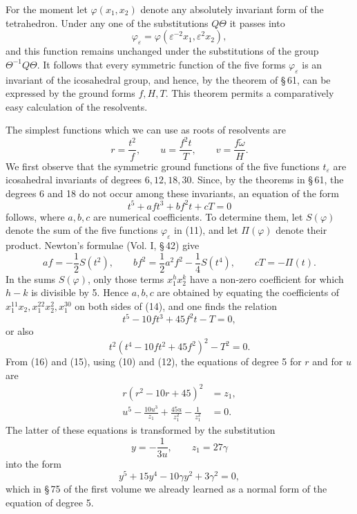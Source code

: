 \documentclass[11pt]{article}
\providecommand{\eps}{\varepsilon}
\providecommand{\eps}{\varepsilon}
\begin{document}
For the moment let \(\varphi(x_1,x_2)\) denote any absolutely invariant form of the tetrahedron. Under any one of the substitutions \(Q\Theta\) it passes into
\begin{equation}
\varphi_\eps=\varphi(\eps^{-2}x_1,\eps^2x_2),
\tag{11}
\end{equation}
and this function remains unchanged under the substitutions of the group \(\Theta^{-1}Q\Theta\). It follows that every symmetric function of the five forms \(\varphi_\eps\) is an invariant of the icosahedral group, and hence, by the theorem of \S\,61, can be expressed by the ground forms \(f,H,T\). This theorem permits a comparatively easy calculation of the resolvents.

The simplest functions which we can use as roots of resolvents are
\begin{equation}
r=\frac{t^2}{f},
\qquad
u=\frac{f^2t}{T},
\qquad
v=\frac{f\tilde\omega}{H}.
\tag{12}
\end{equation}
We first observe that the symmetric ground functions of the five functions \(t_\eps\) are icosahedral invariants of degrees \(6,12,18,30\). Since, by the theorems in \S\,61, the degrees 6 and 18 do not occur among these invariants, an equation of the form
\begin{equation}
t^5+aft^3+bf^2t+cT=0
\tag{13}
\end{equation}
follows, where \(a,b,c\) are numerical coefficients. To determine them, let \(S(\varphi)\) denote the sum of the five functions \(\varphi_\eps\) in (11), and let \(\Pi(\varphi)\) denote their product. Newton's formulae (Vol. I, \S\,42) give
\begin{equation}
af=-\frac12S(t^2),\qquad bf^2=\frac12a^2f^2-\frac14S(t^4),\qquad cT=-\Pi(t).
\tag{14}
\end{equation}
In the sums \(S(\varphi)\), only those terms \(x_1^hx_2^k\) have a non-zero coefficient for which \(h-k\) is divisible by 5. Hence \(a,b,c\) are obtained by equating the coefficients of \(x_1^{11}x_2,x_1^{22}x_2^2,x_1^{30}\) on both sides of (14), and one finds the relation
\begin{equation}
t^5-10ft^3+45f^2t-T=0,
\tag{15}
\end{equation}
or also
\begin{equation}
t^2(t^4-10ft^2+45f^2)^2-T^2=0.
\tag{16}
\end{equation}
From (16) and (15), using (10) and (12), the equations of degree 5 for \(r\) and for \(u\) are
\begin{align}
r(r^2-10r+45)^2&=z_1,\tag{17}\\
u^5-\frac{10u^3}{z_1}+\frac{45u}{z_1^2}-\frac{1}{z_1^2}&=0.\tag{18}
\end{align}
The latter of these equations is transformed by the substitution
\begin{equation}
y=-\frac{1}{3u},\qquad z_1=27\gamma
\tag{19}
\end{equation}
into the form
\begin{equation}
y^5+15y^4-10\gamma y^2+3\gamma^2=0,
\tag{20}
\end{equation}
which in \S\,75 of the first volume we already learned as a normal form of the equation of degree 5.
\end{document}
